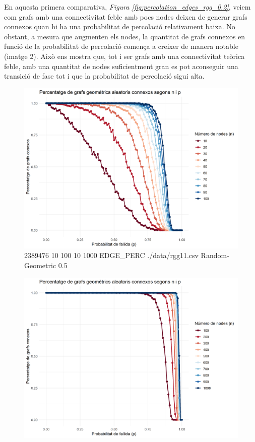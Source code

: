 \documentclass[a4paper]{article}
\begin{document}
	En aquesta primera comparativa, \textit{Figura \ref{fig:percolation_edges_rgg_0.2}}, veiem com grafs amb una connectivitat feble amb pocs nodes deixen de generar grafs connexos quan hi ha una probabilitat de percolació relativament baixa. No obstant, a mesura que augmenten els nodes, la quantitat de grafs connexos
	en funció de la probabilitat de percolació comença a creixer de manera notable (imatge 2). Això ens mostra que, tot i ser grafs amb una connectivitat teòrica feble, amb una quantitat de nodes suficientment gran es pot aconseguir una transició de fase tot i que la probabilitat
	de percolació sigui alta. 
	
	\begin{figure}[H]
		\centering
		\begin{minipage}{0.45\textwidth}
			\centering
			\includegraphics[width=\textwidth]{images/randomGeometric_10-100_0.5}
			\footnotesize{2389476 10 100 10 1000 EDGE\_PERC ./data/rgg11.csv Random-Geometric 0.5}
		\end{minipage}
		\hfill
		\begin{minipage}{0.45\textwidth}
			\centering
			\includegraphics[width=\textwidth]{images/randomGeometric_100-1000_0.5}

\end{minipage}
\end{figure}
\end{document}
